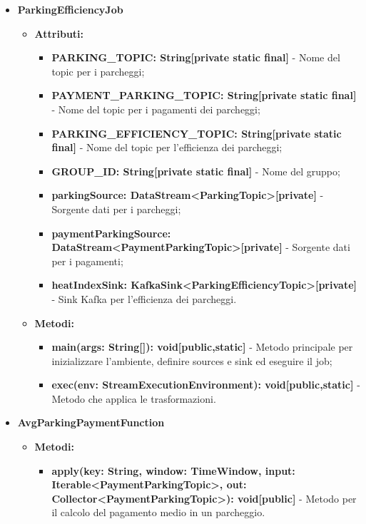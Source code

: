 \documentclass[8pt]{article}
\begin{document}
\begin{itemize}
    \item \textbf{ParkingEfficiencyJob}
    \begin{itemize}
        \item \textbf{Attributi:}
        \begin{itemize}
            \item \textbf{PARKING\_TOPIC: String[private static final]} - Nome del topic per i parcheggi;
            \item \textbf{PAYMENT\_PARKING\_TOPIC: String[private static final]} - Nome del topic per i pagamenti dei parcheggi;
            \item \textbf{PARKING\_EFFICIENCY\_TOPIC: String[private static final]} - Nome del topic per l'efficienza dei parcheggi;
            \item \textbf{GROUP\_ID: String[private static final]} - Nome del gruppo;
            \item \textbf{parkingSource: DataStream<ParkingTopic>[private]} - Sorgente dati per i parcheggi;
            \item \textbf{paymentParkingSource: DataStream<PaymentParkingTopic>[private]} - Sorgente dati per i pagamenti;
            \item \textbf{heatIndexSink: KafkaSink<ParkingEfficiencyTopic>[private]} - Sink Kafka per l'efficienza dei parcheggi.
        \end{itemize}
    \end{itemize}
    \begin{itemize}
        \item \textbf{Metodi:}
        \begin{itemize}
            \item \textbf{main(args: String[]): void[public,static]} - Metodo principale per inizializzare l'ambiente, definire sources e sink ed eseguire il job;
            \item \textbf{exec(env: StreamExecutionEnvironment): void[public,static]} - Metodo che applica le trasformazioni.
        \end{itemize}
    \end{itemize}
    \item \textbf{AvgParkingPaymentFunction}
    \begin{itemize}
        \item \textbf{Metodi:}
        \begin{itemize}
            \item \textbf{apply(key: String, window: TimeWindow, input: Iterable<PaymentParkingTopic>, out: Collector<PaymentParkingTopic>): void[public]} - Metodo per il calcolo del pagamento medio in un parcheggio.

\end{itemize}
\end{itemize}
\end{itemize}
\end{document}
